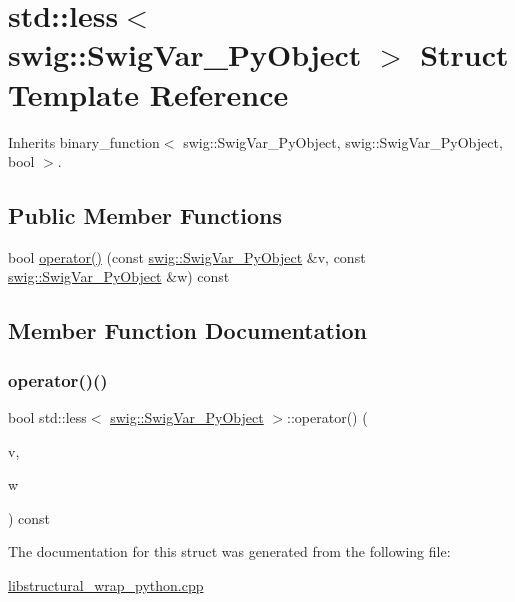 \hypertarget{structstd_1_1less_3_01swig_1_1_swig_var___py_object_01_4}{}\section{std\+:\+:less$<$ swig\+:\+:Swig\+Var\+\_\+\+Py\+Object $>$ Struct Template Reference}
\label{structstd_1_1less_3_01swig_1_1_swig_var___py_object_01_4}


Inherits binary\+\_\+function$<$ swig\+::\+Swig\+Var\+\_\+\+Py\+Object, swig\+::\+Swig\+Var\+\_\+\+Py\+Object, bool $>$.

\subsection*{Public Member Functions}
\begin{DoxyCompactItemize}
\item 
bool \hyperlink{structstd_1_1less_3_01swig_1_1_swig_var___py_object_01_4_af01d1f1add92ca309f9bf39e55ee18f8}{operator()} (const \hyperlink{structswig_1_1_swig_var___py_object}{swig\+::\+Swig\+Var\+\_\+\+Py\+Object} \&v, const \hyperlink{structswig_1_1_swig_var___py_object}{swig\+::\+Swig\+Var\+\_\+\+Py\+Object} \&w) const
\end{DoxyCompactItemize}


\subsection{Member Function Documentation}
\mbox{\label{structstd_1_1less_3_01swig_1_1_swig_var___py_object_01_4_af01d1f1add92ca309f9bf39e55ee18f8}} 
\subsubsection{\texorpdfstring{operator()()}{operator()()}}
{\footnotesize\ttfamily bool std\+::less$<$ \hyperlink{structswig_1_1_swig_var___py_object}{swig\+::\+Swig\+Var\+\_\+\+Py\+Object} $>$\+::operator() (\begin{DoxyParamCaption}\item[{const \hyperlink{structswig_1_1_swig_var___py_object}{swig\+::\+Swig\+Var\+\_\+\+Py\+Object} \&}]{v,  }\item[{const \hyperlink{structswig_1_1_swig_var___py_object}{swig\+::\+Swig\+Var\+\_\+\+Py\+Object} \&}]{w }\end{DoxyParamCaption}) const\hspace{0.3cm}{\ttfamily [inline]}}



The documentation for this struct was generated from the following file\+:\begin{DoxyCompactItemize}
\item 
\hyperlink{libstructural__wrap__python_8cpp}{libstructural\+\_\+wrap\+\_\+python.\+cpp}\end{DoxyCompactItemize}
